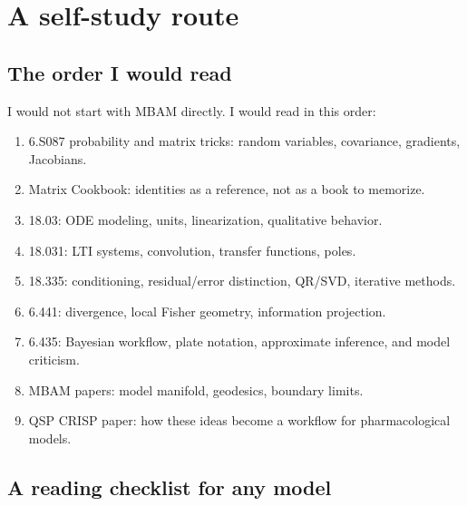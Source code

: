 \documentclass[a4paper]{article}
\begin{document}


\section{A self-study route}

\subsection{The order I would read}

I would not start with MBAM directly.  I would read in this order:
\begin{enumerate}[leftmargin=2em]
  \item 6.S087 probability and matrix tricks: random variables, covariance, gradients, Jacobians.
  \item Matrix Cookbook: identities as a reference, not as a book to memorize.
  \item 18.03: ODE modeling, units, linearization, qualitative behavior.
  \item 18.031: LTI systems, convolution, transfer functions, poles.
  \item 18.335: conditioning, residual/error distinction, QR/SVD, iterative methods.
  \item 6.441: divergence, local Fisher geometry, information projection.
  \item 6.435: Bayesian workflow, plate notation, approximate inference, and model criticism.
  \item MBAM papers: model manifold, geodesics, boundary limits.
  \item QSP CRISP paper: how these ideas become a workflow for pharmacological models.
\end{enumerate}

\subsection{A reading checklist for any model}
\end{document}
